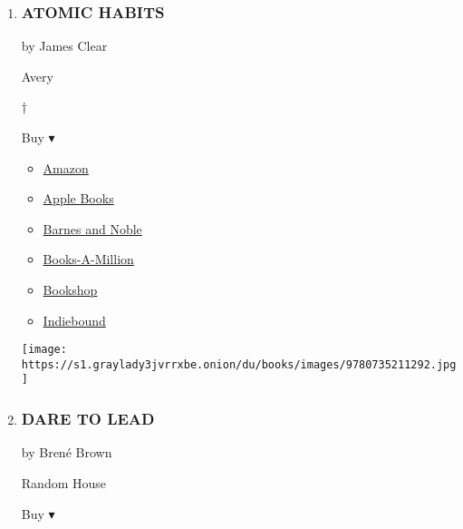 \begin{enumerate}
\def\labelenumi{\arabic{enumi}.}
\item
  \hypertarget{atomic-habits}{%
  \subsubsection{ATOMIC HABITS}\label{atomic-habits}}

  by James Clear

  Avery

  †

  Buy ▾

  \begin{itemize}
  \tightlist
  \item
    \href{https://www.amazon.com/Atomic-Habits-Proven-Build-Break/dp/0735211299?tag=NYTBS-20}{Amazon}
  \item
    \href{https://du-gae-books-dot-nyt-du-prd.appspot.com/buy?title=ATOMIC+HABITS\&author=James+Clear}{Apple
    Books}
  \item
    \href{https://www.anrdoezrs.net/click-7990613-11819508?url=https\%3A\%2F\%2Fwww.barnesandnoble.com\%2Fw\%2F\%3Fean\%3D9780735211292}{Barnes
    and Noble}
  \item
    \href{https://www.anrdoezrs.net/click-7990613-35140?url=https\%3A\%2F\%2Fwww.booksamillion.com\%2Fp\%2FATOMIC\%2BHABITS\%2FJames\%2BClear\%2F9780735211292}{Books-A-Million}
  \item
    \href{https://bookshop.org/a/3546/9780735211292}{Bookshop}
  \item
    \href{https://www.indiebound.org/book/9780735211292?aff=NYT}{Indiebound}
  \end{itemize}

  \texttt{[image: https://s1.graylady3jvrrxbe.onion/du/books/images/9780735211292.jpg]}
\item
  \hypertarget{dare-to-lead}{%
  \subsubsection{DARE TO LEAD}\label{dare-to-lead}}

  by Brené Brown

  Random House

  Buy ▾


\end{enumerate}
